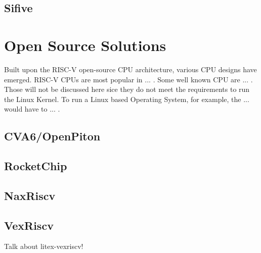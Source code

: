 \subsection{Sifive}


\section{Open Source Solutions}
Built upon the RISC-V open-source CPU architecture, various CPU designs have emerged. RISC-V CPUs are most popular in ... . Some well known CPU are ... . Those will not be discussed here sice they do not meet the requirements to run the Linux Kernel. To run a Linux based Operating System, for example, the ... would have to ... .

\subsection{CVA6/OpenPiton}
\subsection{RocketChip}
\subsection{NaxRiscv}
\subsection{VexRiscv}

Talk about litex-vexriscv!